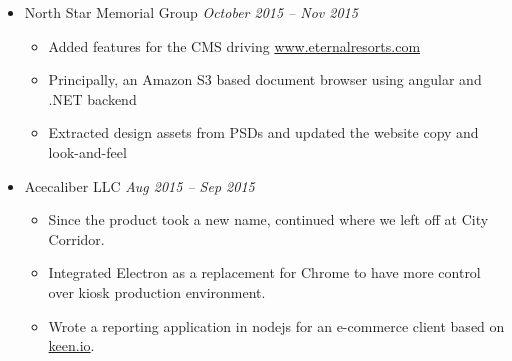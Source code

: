 \documentclass[11pt,letter,roman]{moderncv}
\begin{document}
{\begin{itemize}
\begin{itemize}
			\begin{itemize}
				\item Despite not being recognized as an owner on the latter due to team structure, I was considered an in-house expert and go-to for authentication APIs
				\item {\em Note}: authentication included standard login but also Facebook oAuth flow
			\end{itemize}
			\item Added order history fetching using Raw SQL in Order Management Service, and profiled the same for performance.
			\item Updated \href{https://www.underarmour.com}{www.underarmour.com} to use the new auth flows
			\item Communicated with mobile teams for UA Shop App (both iOS and Android), and maintained usage documentation for the apis in addition to the published swagger docs
		\end{itemize}
	\vspace{\baselineskip}
	\item North Star Memorial Group \hfill \textit{October 2015 -- Nov 2015}
		\begin{itemize}
			\item Added features for the CMS driving \href{https://www.eternalresorts.com}{www.eternalresorts.com}
			\item Principally, an Amazon S3 based document browser using angular and .NET backend
			\item Extracted design assets from PSDs and updated the website copy and look-and-feel
		\end{itemize}
	\vspace{\baselineskip} %
	\item Acecaliber LLC \hfill \textit{Aug 2015 -- Sep 2015}
		\begin{itemize}
			\item Since the product took a new name, continued where we left off at City Corridor.
			\item Integrated Electron as a replacement for Chrome to have more control over kiosk production environment.
			\item Wrote a reporting application in nodejs for an e-commerce client based on \href{https://keen.io}{keen.io}.
		\end{itemize}
	\end{itemize}
}

\vspace{\baselineskip}
\end{document}
